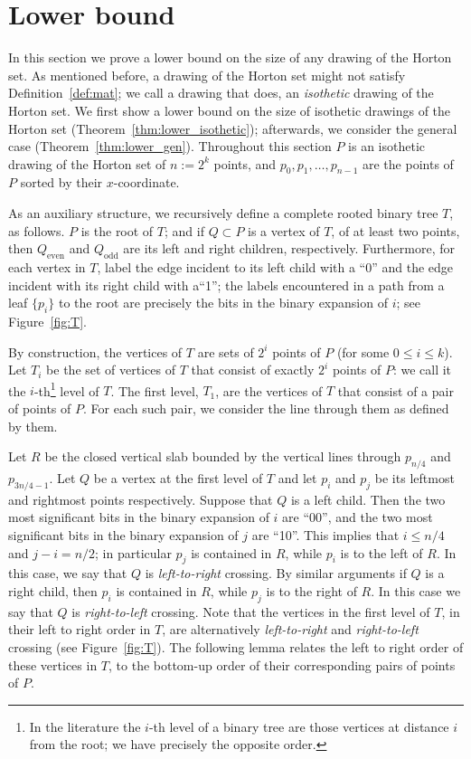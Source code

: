 \documentclass{article}
\begin{document}
\section{Lower bound} \label{sec:lower}

In this section we prove a lower bound on the size of any
drawing of the Horton set. 
As mentioned before, a drawing of the Horton set might not
satisfy Definition~\ref{def:mat};
we call a drawing  that does, an \emph{isothetic} drawing
of the Horton set.
We first show a lower bound on the size of isothetic drawings
of the Horton set (Theorem~\ref{thm:lower_isothetic}); afterwards, we 
consider the general case (Theorem~\ref{thm:lower_gen}).
Throughout this section $P$ is an isothetic drawing
of the Horton set of $n:=2^k$ points, and $p_0, p_1,\dots, p_{n-1}$
are the points of $P$ sorted by their $x$-coordinate. 

As an auxiliary structure, we recursively define a complete rooted binary
tree $T$, as follows.  $P$ is the root of $T$; 
and if $Q \subset P$ is a vertex of $T$, of at least two points, 
then $Q_{\textrm{even}}$ and $Q_{\textrm{odd}}$ are its left and right children,
respectively. Furthermore, for each vertex in $T$, label the edge incident to its left
child with a ``0'' and the edge incident with its right child with  a``1'';
the labels encountered in a path from a leaf $\{p_i\}$ to the root are
precisely the bits in the binary expansion of $i$; see Figure~\ref{fig:T}.

By construction, the vertices of $T$ are sets of $2^i$ points of $P$ (for some $0 \le i \le k$). Let $T_i$ be the 
set of vertices of $T$
that consist of exactly $2^i$ points of $P$: we call it the $i$-th\footnote{In the literature
the $i$-th level of a binary tree are those vertices at distance $i$ from the root; we have precisely
the opposite order.} level of $T$. The first level, $T_1$, are the vertices of $T$ that
consist of a pair of points of $P$. For each such pair, we consider the line through them as defined
by them. 

Let $R$ be the closed vertical slab bounded by the vertical lines
through $p_{n/4}$ and $p_{3n/4-1}$. Let $Q$ be a vertex at the first level of $T$
and let $p_i$ and $p_j$ be its leftmost and rightmost points
respectively.
Suppose that $Q$ is a left child. Then the two most significant bits in the 
binary expansion of $i$ are ``00'',
and the two most significant bits in the binary
expansion of $j$ are ``10''.
This implies that $i \le n/4$ and $j-i=n/2$; in particular
$p_j$ is contained in $R$, while $p_i$ is to the left of $R$.
In this case, we say that $Q$ is \emph{left-to-right} crossing.
By similar arguments if $Q$ is a right child, then
$p_i$ is contained in $R$, while $p_j$ is to the right of $R$.
In this case we say that $Q$ is \emph{right-to-left} crossing.
Note that the vertices in the first level of $T$, in their left to right
order in $T$, are alternatively \emph{left-to-right} and 
\emph{right-to-left} crossing (see Figure~\ref{fig:T}).
The following lemma relates the left to right order of these vertices in $T$,
to the bottom-up order of their corresponding pairs of points of $P$.
\end{document}
